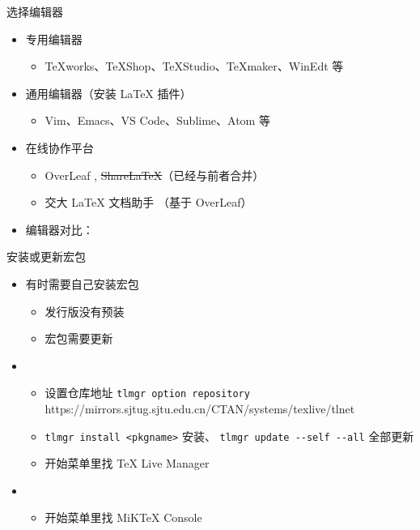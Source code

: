 \begin{frame}{选择编辑器}
  \begin{itemize}
    \item 专用编辑器
          \begin{itemize}
            \item TeXworks、TeXShop、\alert{TeXStudio}、TeXmaker、WinEdt 等
          \end{itemize}
    \item 通用编辑器（安装 \LaTeX{} 插件）
          \begin{itemize}
            \item Vim、Emacs、\alert{VS Code}、Sublime、Atom 等
          \end{itemize}
    \item 在线协作平台
          \begin{itemize}
            \item OverLeaf , \sout{ShareLaTeX}（已经与前者合并）
            \item 交大 LaTeX 文档助手 （基于 OverLeaf）
          \end{itemize}
    \item 编辑器对比：
  \end{itemize}
\end{frame}

\begin{frame}[fragile]{安装或更新宏包}
  \begin{itemize}
    \item 有时需要自己安装宏包
          \begin{itemize}
            \item 发行版没有预装
            \item 宏包需要更新
          \end{itemize}
    \item \TL
          \begin{itemize}
            \item 设置仓库地址 \verb|tlmgr option repository| {\footnotesize\ttfamily
                  https://mirrors.sjtug.sjtu.edu.cn/CTAN/systems/texlive/tlnet}
            \item \verb|tlmgr install <pkgname>| 安装、 \verb|tlmgr update --self --all| 全部更新
            \item \faWindows{} 开始菜单里找 TeX Live Manager
          \end{itemize}
    \item \MiKTeX
          \begin{itemize}
            \item \faWindows{} 开始菜单里找 MiKTeX Console
          \end{itemize}
  \end{itemize}
\end{frame}
